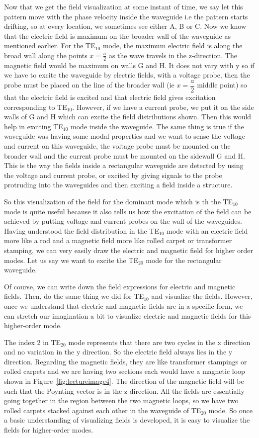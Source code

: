 Now that we get the field visualization at some instant of time, we say let this pattern move with the phase velocity inside the waveguide i.e the pattern starts drifting, so at every location, we sometimes see either A, B or C. Now we know that the electric field is maximum on the broader wall of the waveguide as mentioned earlier. For the TE$_{10}$ mode, the maximum electric field is along the broad wall along the points   $x = \frac{a}{2}$ as the wave travels in the z-direction. The magnetic field would be maximum on walls G and H. It does not vary with y so if we have to excite the waveguide by electric fields, with a voltage probe, then the probe must be placed on the line of the broader wall (ie $x = \dfrac{a}{2}$ middle point) so that the electric field is excited and that electric field gives excitation corresponding to TE$_{10}$. However, if we have a current probe, we put it on the side walls of G and H which can excite the field distributions shown. Then this would help in exciting TE$_{10}$ mode inside the waveguide. The same thing is true if the waveguide was having some modal properties and we want to sense the voltage and current on this waveguide, the voltage probe must be mounted on the broader wall and the current probe must be mounted on the sidewall G and H. This is the way the fields inside a rectangular waveguide are detected by using the voltage and current probe, or excited by giving signals to the probe protruding into the waveguides and then exciting a field inside a structure.

So this visualization of the field for the dominant mode which is th the TE$_{10}$ mode is quite useful because it also tells us how the excitation of the field can be achieved by putting voltage and current probes on the wall of the waveguides. Having understood the field distribution in the  TE$_{10}$ mode with an electric field more like a rod and a magnetic field more like rolled carpet or transformer stamping, we can very easily draw the electric and magnetic field for higher order modes. Let us say we want to excite the TE$_{20}$ mode for the rectangular waveguide.

Of course, we can write down the field expressions for electric and magnetic fields. Then, do the same thing we did for TE$_{10}$ and visualize the fields. However, once we understand that electric and magnetic fields are in a specific form, we can stretch our imagination a bit to visualize electric and magnetic fields for this higher-order mode.

The index 2 in TE$_{20}$ mode represents that there are two cycles in the x direction and no variation in the y direction. So the electric field always lies in the y direction. Regarding the magnetic fields, they are like transformer stampings or rolled carpets and we are having two sections each would have a magnetic loop shown in Figure~\ref{fig:lectureimage4}. The direction of the magnetic field will be such that the Poynting vector is in the z-direction. All the fields are essentially going together in the region between the two magnetic loops, so we have two rolled carpets stacked against each other in the waveguide of TE$_{20}$ mode. So once a basic understanding of visualizing fields is developed, it is easy to visualize the fields for higher-order modes. 

